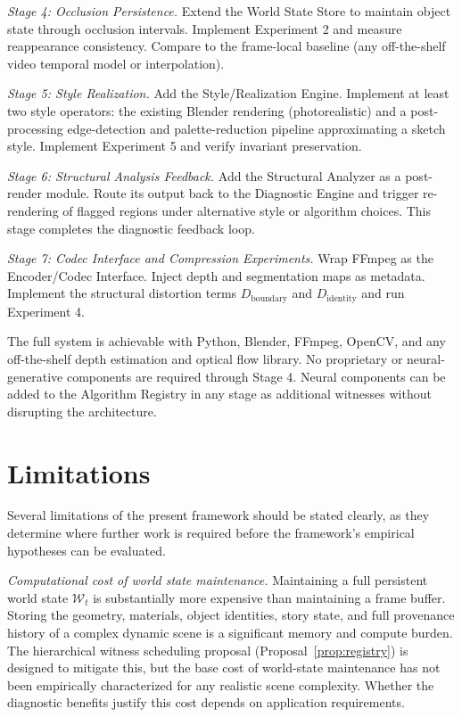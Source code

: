 \documentclass[12pt,a4paper]{article}
\theoremstyle{plain}
\theoremstyle{definition}
\theoremstyle{remark}
\begin{document}
\textit{Stage 4: Occlusion Persistence.} Extend the World State Store to maintain object state through occlusion intervals. Implement Experiment 2 and measure reappearance consistency. Compare to the frame-local baseline (any off-the-shelf video temporal model or interpolation).

\textit{Stage 5: Style Realization.} Add the Style/Realization Engine. Implement at least two style operators: the existing Blender rendering (photorealistic) and a post-processing edge-detection and palette-reduction pipeline approximating a sketch style. Implement Experiment 5 and verify invariant preservation.

\textit{Stage 6: Structural Analysis Feedback.} Add the Structural Analyzer as a post-render module. Route its output back to the Diagnostic Engine and trigger re-rendering of flagged regions under alternative style or algorithm choices. This stage completes the diagnostic feedback loop.

\textit{Stage 7: Codec Interface and Compression Experiments.} Wrap FFmpeg \cite{ffmpeg2024} as the Encoder/Codec Interface. Inject depth and segmentation maps as metadata. Implement the structural distortion terms $D_{\mathrm{boundary}}$ and $D_{\mathrm{identity}}$ and run Experiment 4.

The full system is achievable with Python, Blender, FFmpeg, OpenCV, and any off-the-shelf depth estimation and optical flow library. No proprietary or neural-generative components are required through Stage 4. Neural components can be added to the Algorithm Registry in any stage as additional witnesses without disrupting the architecture.

\section{Limitations}
\label{sec:limitations}

Several limitations of the present framework should be stated clearly, as they determine where further work is required before the framework's empirical hypotheses can be evaluated.

\textit{Computational cost of world state maintenance.} Maintaining a full persistent world state $\mathcal{W}_t$ is substantially more expensive than maintaining a frame buffer. Storing the geometry, materials, object identities, story state, and full provenance history of a complex dynamic scene is a significant memory and compute burden. The hierarchical witness scheduling proposal (Proposal~\ref{prop:registry}) is designed to mitigate this, but the base cost of world-state maintenance has not been empirically characterized for any realistic scene complexity. Whether the diagnostic benefits justify this cost depends on application requirements.
\end{document}
